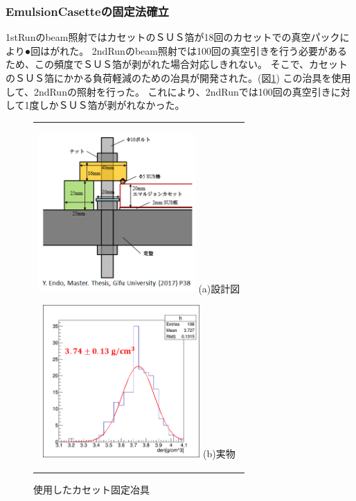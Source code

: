 \documentclass[12pt,a4paper]{jarticle}
\begin{document}
\subsubsection{EmulsionCasetteの固定法確立}
1stRunのbeam照射ではカセットのＳＵＳ箔が18回のカセットでの真空パックにより●回はがれた。
2ndRunのbeam照射では100回の真空引きを行う必要があるため、この頻度でＳＵＳ箔が剥がれた場合対応しきれない。
そこで、カセットのＳＵＳ箔にかかる負荷軽減のための冶具が開発された。(図\ref{fig:casette_fix})
この治具を使用して、2ndRunの照射を行った。
これにより、2ndRunでは100回の真空引きに対して1度しかＳＵＳ箔が剥がれなかった。
\begin{figure}[htbp]
  \centering
      \begin{tabular}{c}
        \begin{minipage}{0.5\hsize}
          \centering
            \includegraphics[clip, width=60mm]{casette_fix_moderu.png}
            \hspace{1.6cm} (a)設計図
        \end{minipage}
        
        \begin{minipage}{0.5\hsize}
          \centering
            \includegraphics[clip, width=60mm]{2ndRun_thin_den.png}
            \hspace{1.6cm} (b)実物
        \end{minipage}
    
      \end{tabular}
      \caption{使用したカセット固定冶具\label{fig:casette_fix}}
\end{figure}
\newpage
\end{document}
